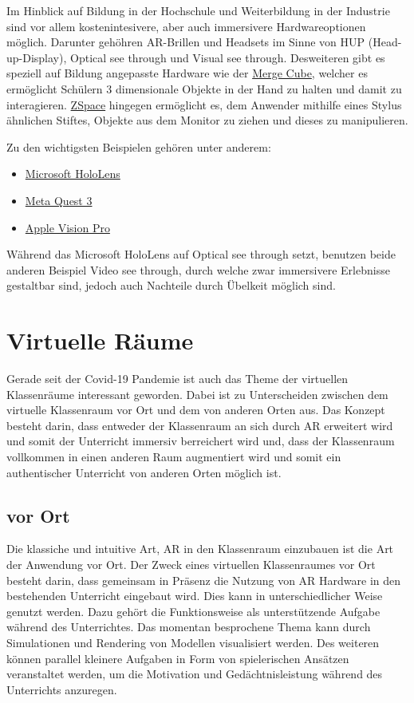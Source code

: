 \documentclass[conference]{IEEEtran}
\begin{document}
Im Hinblick auf Bildung in der Hochschule und Weiterbildung in der Industrie sind vor allem kostenintesivere,
aber auch immersivere Hardwareoptionen möglich. Darunter gehöhren AR-Brillen und Headsets im Sinne von HUP (Head-up-Display),
Optical see through und Visual see through. Desweiteren gibt es speziell auf Bildung angepasste Hardware wie der 
\href{https://mergeedu.com/cube?cr=4646}{Merge Cube}, welcher es ermöglicht Schülern 3 dimensionale Objekte in der Hand zu
halten und damit zu interagieren. \href{https://zspace.com/}{ZSpace} hingegen ermöglicht es, dem Anwender mithilfe eines Stylus 
ähnlichen Stiftes, Objekte aus dem Monitor zu ziehen und dieses zu manipulieren.

Zu den wichtigsten Beispielen gehören unter anderem:
\begin{itemize}
    \item \href{https://www.microsoft.com/de-de/hololens}{Microsoft HoloLens}
    \item \href{https://www.meta.com/de/quest/quest-3/}{Meta Quest 3}
    \item \href{https://www.apple.com/de/apple-vision-pro/}{Apple Vision Pro}
\end{itemize}

Während das Microsoft HoloLens auf Optical see through setzt, benutzen beide anderen Beispiel Video see through, durch welche
zwar immersivere Erlebnisse gestaltbar sind, jedoch auch Nachteile durch Übelkeit möglich sind.


\section{Virtuelle Räume}
Gerade seit der Covid-19 Pandemie ist auch das Theme der virtuellen Klassenräume interessant geworden.
Dabei ist zu Unterscheiden zwischen dem virtuelle Klassenraum vor Ort und dem von anderen Orten aus.
Das Konzept besteht darin, dass entweder der Klassenraum an sich durch AR erweitert wird und somit der Unterricht
immersiv berreichert wird und, dass der Klassenraum vollkommen in einen anderen Raum augmentiert wird und somit
ein authentischer Unterricht von anderen Orten möglich ist.

\subsection{vor Ort}
Die klassiche und intuitive Art, AR in den Klassenraum einzubauen ist die Art der Anwendung vor Ort.
Der Zweck eines virtuellen Klassenraumes vor Ort besteht darin, dass gemeinsam in Präsenz die Nutzung von AR Hardware in den 
bestehenden Unterricht eingebaut wird. Dies kann in unterschiedlicher Weise genutzt werden. Dazu gehört die Funktionsweise 
als unterstützende Aufgabe während des Unterrichtes. Das momentan besprochene Thema kann durch Simulationen und Rendering von 
Modellen visualisiert werden. Des weiteren können parallel kleinere Aufgaben in Form von spielerischen Ansätzen veranstaltet werden,
um die Motivation und Gedächtnisleistung während des Unterrichts anzuregen. 
\end{document}
